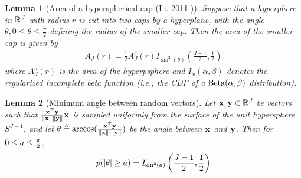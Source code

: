 \documentclass[]{article}
\newtheorem{lemma}{Lemma}[section]
\begin{document}
\begin{lemma}[Area of a hyperspherical cap (Li. 2011 \cite{hypersphericalCap})] \label{thm:cap_area}
Suppose that a hyperphere in $\mathbb{R}^J$ with radius $r$ is cut into two caps by a hyperplane, with the angle $\theta, 0 \le \theta \le \frac{\pi}{2}$ defining the radius of the smaller cap. Then the area of the smaller cap is given by
\begin{align}
    A_J(r) = \frac{1}{2} A^s_J(r) I_{\sin^2(\theta)} \left( \frac{J-1}{2}, \frac{1}{2} \right)
\end{align}
where $A^s_J(r)$ is the area of the hyperpsphere and $I_x(\alpha, \beta)$ denotes the regularized incomplete beta function (i.e., the CDF of a $\operatorname{Beta}(\alpha, \beta)$ distribution).
\end{lemma}


\begin{lemma}[Minimum angle between random vectors] \label{thm:rand_angle}
Let $\mathbf{x}, \mathbf{y} \in \mathbb{R}^J$ be vectors such that $\frac{\mathbf{x}^\top\mathbf{y}}{\lVert\mathbf{x}\rVert\lVert\mathbf{y}\rVert} \mathbf{x}$ is sampled uniformly from the surface of the unit hypersphere $S^{J-1}$, and let $\theta \triangleq \arccos(\frac{\mathbf{x}^\top\mathbf{y}}{\lVert\mathbf{x}\rVert \cdot \lVert\mathbf{y}\rVert })$ be the angle between $\mathbf{x}$ and $\mathbf{y}$. Then for $0 \le a \le \frac{\pi}{2}$,
\begin{align} \label{eq:rand_angle}
    p(\lvert\theta\rvert \ge a) = I_{\sin^2(a)} \left( \frac{J-1}{2}, \frac{1}{2} \right)
\end{align}
\end{lemma}
\end{document}
